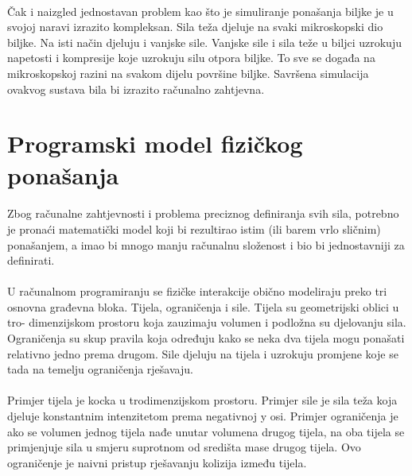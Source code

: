 \documentclass[times, utf8, diplomski]{fer}
\begin{document}
\paragraph{}
Čak i naizgled jednostavan problem kao što je simuliranje ponašanja biljke je u svojoj 
naravi izrazito kompleksan. Sila teža djeluje na svaki mikroskopski dio biljke. Na isti 
način djeluju i vanjske sile. Vanjske sile i sila teže u biljci uzrokuju napetosti i 
kompresije koje uzrokuju silu otpora biljke. To sve se događa na mikroskopskoj razini na 
svakom dijelu površine biljke. Savršena simulacija ovakvog sustava bila bi izrazito  
računalno zahtjevna.

\section{Programski model fizičkog ponašanja} \label{physics_model}
\paragraph{}
Zbog računalne zahtjevnosti i problema preciznog definiranja svih sila, potrebno je pronaći
matematički model koji bi rezultirao istim (ili barem vrlo sličnim) ponašanjem, a imao bi 
mnogo manju računalnu složenost i bio bi jednostavniji za definirati.

\paragraph{}
U računalnom programiranju se fizičke interakcije obično modeliraju preko tri osnovna  
građevna bloka. Tijela, ograničenja i sile. Tijela su geometrijski oblici u tro-
dimenzijskom prostoru koja zauzimaju volumen i podložna su djelovanju sila. Ograničenja 
su skup pravila koja određuju kako se neka dva tijela mogu ponašati relativno jedno prema 
drugom. Sile djeluju na tijela i uzrokuju promjene koje se tada na temelju ograničenja 
rješavaju.

\paragraph{}
Primjer tijela je kocka u trodimenzijskom prostoru. Primjer sile je sila teža koja djeluje 
konstantnim intenzitetom prema negativnoj y osi. Primjer ograničenja je ako se volumen 
jednog tijela nađe unutar volumena drugog tijela, na oba tijela se primjenjuje sila u smjeru 
suprotnom od središta mase drugog tijela. Ovo ograničenje je naivni pristup rješavanju 
kolizija između tijela.
\end{document}
